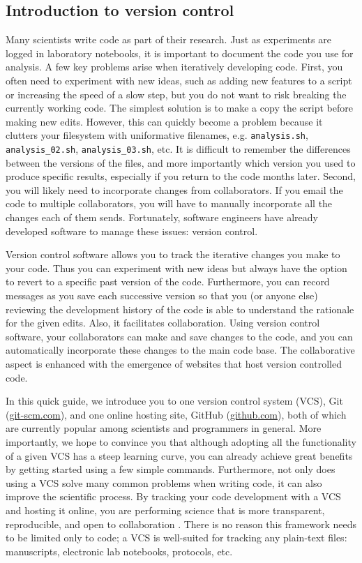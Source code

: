 \subsection{Introduction to version control}

Many scientists write code as part of their research.
Just as experiments are logged in laboratory notebooks, it is important to document the code you use for analysis.
A few key problems arise when iteratively developing code.
First, you often need to experiment with new ideas, such as adding new features to a script or increasing the speed of a slow step, but you do not want to risk breaking the currently working code.
The simplest solution is to make a copy the script before making new edits.
However, this can quickly become a problem because it clutters your filesystem with uniformative filenames, e.g. \verb|analysis.sh|, \verb|analysis_02.sh|, \verb|analysis_03.sh|, etc.
It is difficult to remember the differences between the versions of the files, and more importantly which version you used to produce specific results, especially if you return to the code months later.
Second, you will likely need to incorporate changes from collaborators.
If you email the code to multiple collaborators, you will have to manually incorporate all the changes each of them sends.
Fortunately, software engineers have already developed software to manage these issues: version control.

Version control software allows you to track the iterative changes you make to your code.
Thus you can experiment with new ideas but always have the option to revert to a specific past version of the code.
Furthermore, you can record messages as you save each successive version so that you (or anyone else) reviewing the development history of the code is able to understand the rationale for the given edits.
Also, it facilitates collaboration.
Using version control software, your collaborators can make and save changes to the code, and you can automatically incorporate these changes to the main code base.
The collaborative aspect is enhanced with the emergence of websites that host version controlled code.

In this quick guide, we introduce you to one version control system (VCS), Git (\href{http://git-scm.com/}{git-scm.com}), and one online hosting site, GitHub (\href{https://github.com}{github.com}), both of which are currently popular among scientists and programmers in general.
More importantly, we hope to convince you that although adopting all the functionality of a given VCS has a steep learning curve, you can already achieve great benefits by getting started using a few simple commands.
Furthermore, not only does using a VCS solve many common problems when writing code, it can also improve the scientific process.
By tracking your code development with a VCS and hosting it online, you are performing science that is more transparent, reproducible, and open to collaboration \cite{23448176}.
There is no reason this framework needs to be limited only to code; a VCS is well-suited for tracking any plain-text files: manuscripts, electronic lab notebooks, protocols, etc.